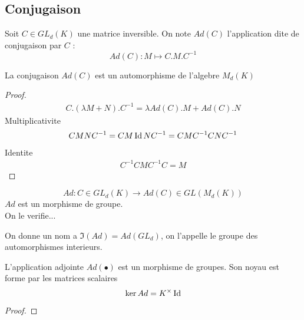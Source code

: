 \documentclass[../main.tex]{subfiles}
\begin{document}
\subsection{Conjugaison}
\begin{defn}
	Soit $C\in GL_d( K) $ une matrice inversible. On note $Ad( C)$ l'application dite de conjugaison par $C$ :
	\[ 
		Ad( C) : M \mapsto C.M.C^{-1}
	\]
	
\end{defn}
\begin{propo}
	La conjugaison $Ad( C)$ est un automorphisme de l'algebre $M_d( K) $ 
\end{propo}
\begin{proof}
	\begin{align*}
		C.( \lambda M + N).C^{-1}= \lambda Ad( C) .M + Ad(  C).N
	\end{align*}
	Multiplicativite
	\begin{align*}
	CMNC^{-1}= CM\operatorname*{Id} NC^{-1}= CMC^{-1}CNC^{-1}
	\end{align*}
	Identite
	\begin{align*}
	C^{-1}CMC^{-1}C = M
	\end{align*}
	
	
	
\end{proof}
\begin{defn}
	\[ 
		Ad: C \in GL_d( K) \to Ad( C)  \in GL( M_d( K) ) 
	\]
	$Ad$ est un morphisme de groupe.\\
	On le verifie...


\end{defn}
On donne un nom a $\Im( Ad) = Ad( GL_d) $, on l'appelle le groupe des automorphismes interieurs.

\begin{propo}
	L'application adjointe $Ad( \bullet) $ est un morphisme de groupes. Son noyau est forme par les matrices scalaires
	\[ 
	\ker Ad = K^{\times}\operatorname*{Id}
	\]
	
\end{propo}
\begin{proof}

	
\end{proof}












	
\end{document}
